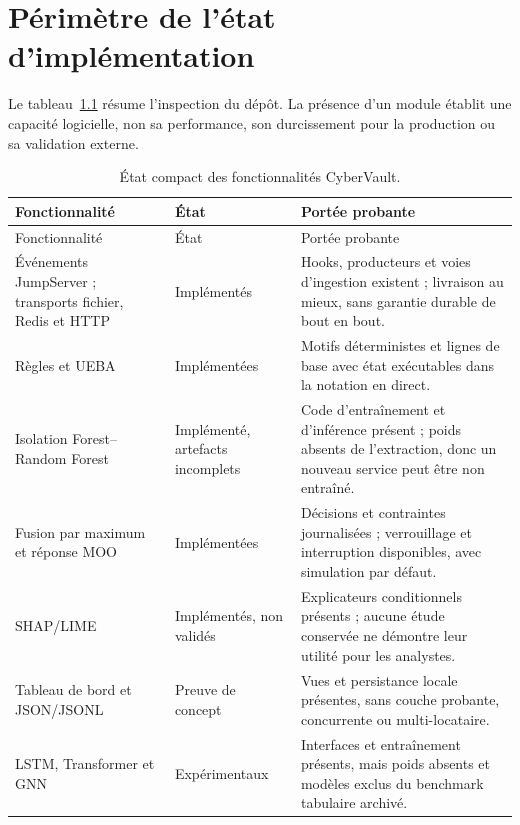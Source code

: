 \documentclass[11pt,a4paper,oneside]{report}
\theoremstyle{definition}
\theoremstyle{plain}
\begin{document}
\label{app:confusion-counts}
\label{tab:app-confusion}

\chapter{Périmètre de l'état d'implémentation}
\label{app:status}

Le tableau~\ref{tab:app-status} résume l'inspection du dépôt. La présence d'un
module établit une capacité logicielle, non sa performance, son durcissement
pour la production ou sa validation externe.

\begin{longtable}{@{}p{}p{}p{}@{}}
\caption{État compact des fonctionnalités CyberVault.}
\label{tab:app-status}\\
\toprule
Fonctionnalité & État & Portée probante \\
\midrule
\endfirsthead
\toprule
Fonctionnalité & État & Portée probante \\
\midrule
\endhead
Événements JumpServer ; transports fichier, Redis et HTTP &
Implémentés & Hooks, producteurs et voies d'ingestion existent ; livraison au
mieux, sans garantie durable de bout en bout. \\
Règles et UEBA & Implémentées & Motifs déterministes et lignes de base avec
état exécutables dans la notation en direct. \\
Isolation Forest--Random Forest & Implémenté, artefacts incomplets & Code
d'entraînement et d'inférence présent ; poids absents de l'extraction, donc un
nouveau service peut être non entraîné. \\
Fusion par maximum et réponse MOO & Implémentées & Décisions et contraintes
journalisées ; verrouillage et interruption disponibles, avec simulation par
défaut. \\
SHAP/LIME & Implémentés, non validés & Explicateurs conditionnels présents ;
aucune étude conservée ne démontre leur utilité pour les analystes. \\
Tableau de bord et JSON/JSONL & Preuve de concept & Vues et persistance locale
présentes, sans couche probante, concurrente ou multi-locataire. \\
LSTM, Transformer et GNN & Expérimentaux & Interfaces et entraînement présents,
mais poids absents et modèles exclus du benchmark tabulaire archivé. \\

\end{longtable}
\end{document}
